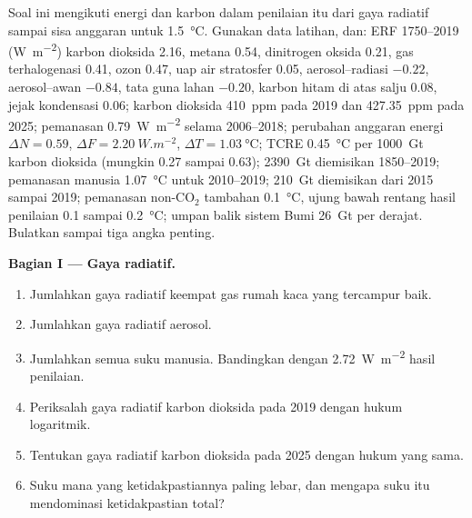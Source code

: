 \begin{problem}\label{pb:b2:anthropogenic-climate-change:1}
Soal ini mengikuti energi dan karbon dalam penilaian itu dari gaya radiatif sampai sisa
anggaran untuk \qty{1.5}{\celsius}. Gunakan data latihan, dan: ERF 1750--2019 (\unit{W.m^{-2}})
karbon dioksida 2.16, metana 0.54, dinitrogen oksida 0.21, gas terhalogenasi 0.41, ozon 0.47,
uap air stratosfer 0.05, aerosol--radiasi $-0.22$, aerosol--awan $-0.84$, tata guna lahan
$-0.20$, karbon hitam di atas salju 0.08, jejak kondensasi 0.06; karbon dioksida \qty{410}{ppm} pada 2019 dan
\qty{427.35}{ppm} pada 2025; pemanasan \qty{0.79}{W.m^{-2}} selama 2006--2018; perubahan anggaran energi
$\Delta N = 0.59$, $\Delta F = \qty{2.20}{W.m^{-2}}$, $\Delta T = \qty{1.03}{\celsius}$; TCRE
\qty{0.45}{\celsius} per \qty{1000}{Gt} karbon dioksida (mungkin 0.27 sampai 0.63); \qty{2390}{Gt}
diemisikan 1850--2019; pemanasan manusia \qty{1.07}{\celsius} untuk 2010--2019; \qty{210}{Gt} diemisikan dari
2015 sampai 2019; pemanasan non-CO$_2$ tambahan \qty{0.1}{\celsius}, ujung bawah rentang hasil penilaian 0.1
sampai \qty{0.2}{\celsius}; umpan balik sistem Bumi \qty{26}{Gt} per derajat. Bulatkan sampai tiga angka
penting.

\noindent\textbf{Bagian I --- Gaya radiatif.}
\begin{enumerate}
  \item Jumlahkan gaya radiatif keempat gas rumah kaca yang tercampur baik.
  \item Jumlahkan gaya radiatif aerosol.
  \item Jumlahkan semua suku manusia. Bandingkan dengan \qty{2.72}{W.m^{-2}} hasil penilaian.
  \item Periksalah gaya radiatif karbon dioksida pada 2019 dengan hukum logaritmik.
  \item Tentukan gaya radiatif karbon dioksida pada 2025 dengan hukum yang sama.
  \item Suku mana yang ketidakpastiannya paling lebar, dan mengapa suku itu mendominasi ketidakpastian total?
\end{enumerate}


\end{problem}

